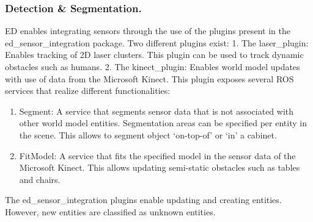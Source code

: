 \subsubsection{Detection \& Segmentation.}
ED enables integrating sensors through the use of the plugins present in the ed\_sensor\_integration package. Two different plugins exist:
1. The laser\_plugin: Enables tracking of 2D laser clusters. This plugin can be used to track dynamic obstacles such as humans.
2. The kinect\_plugin: Enables world model updates with use of data from the Microsoft Kinect\texttrademark. This plugin exposes several ROS services that realize different functionalities:
\begin{enumerate}[label=(\alph*)]
\item Segment: A service that segments sensor data that is not associated with other world model entities. Segmentation areas can be specified per entity in the scene. This allows to segment object ‘on-top-of’ or ‘in’ a cabinet.
\item FitModel: A service that fits the specified model in the sensor data of the Microsoft Kinect\texttrademark. This allows updating semi-static obstacles such as tables and chairs.
\end{enumerate}


The ed\_sensor\_integration plugins enable updating and creating entities. However, new entities are classified as unknown entities.

